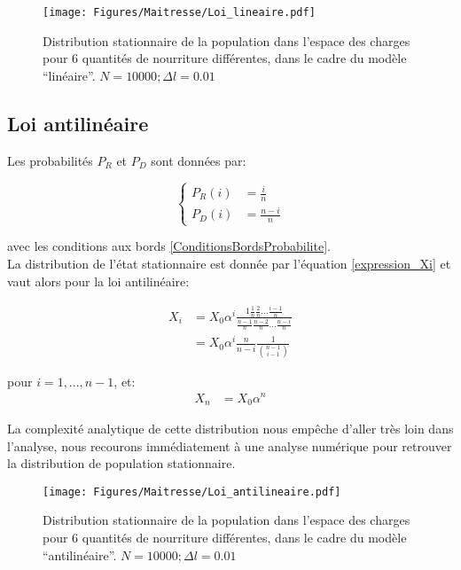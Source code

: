 \begin{figure}[h]
\centering
\texttt{[image: Figures/Maitresse/Loi\_lineaire.pdf]}
\caption{Distribution stationnaire de la population dans l'espace des charges pour 6 quantités de nourriture différentes, dans le cadre du modèle ``linéaire''. $N=10000; \Delta l = 0.01$}
\label{DistribAnalytiqueLin}
\end{figure}




\subsection{Loi antilinéaire}
Les probabilités $P_R$ et $P_D$ sont données par:

\begin{equation}
\left \{
\begin{aligned}
P_R(i) &= \frac{i}{n}\\
P_D(i) &= \frac{n-i}{n}
\end{aligned}
\right.
\end{equation}

avec les conditions aux bords \ref{ConditionsBordsProbabilite}.\\

La distribution de l'état stationnaire est donnée par l'équation \ref{expression_Xi} et vaut alors pour la loi antilinéaire:

\begin{equation}
\begin{aligned}
X_i&=X_0 \alpha^i \frac{1\frac{1}{n}\frac{2}{n}...\frac{i-1}{n}}{\frac{n-1}{n}\frac{n-2}{n}...\frac{n-i}{n}}\\
&=X_0 \alpha^i \frac{n}{n-i}\frac{1}{\binom{n-1}{i-1}}
\end{aligned}
\end{equation}

pour $i=1,...,n-1$, et:
\begin{equation}
\begin{aligned}
X_n&=X_0 \alpha^n
\end{aligned}
\end{equation}

La complexité analytique de cette distribution nous empêche d'aller très loin dans l'analyse, nous recourons immédiatement à une analyse numérique pour retrouver la distribution de population stationnaire.


\begin{figure}[h]
\centering
\texttt{[image: Figures/Maitresse/Loi\_antilineaire.pdf]}
\caption{Distribution stationnaire de la population dans l'espace des charges pour 6 quantités de nourriture différentes, dans le cadre du modèle ``antilinéaire''. $N=10000; \Delta l = 0.01$}
\label{DistribAnalytiqueAnti}
\end{figure}


